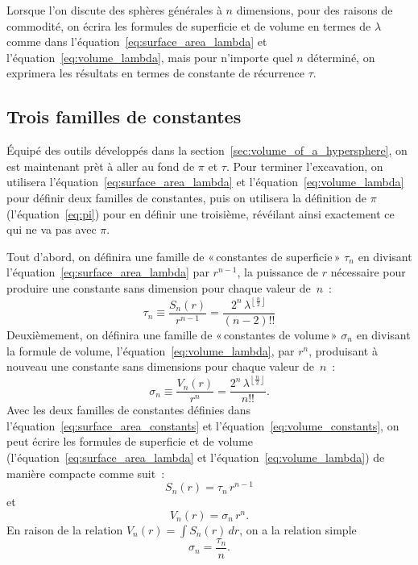 Lorsque l'on discute des sphères générales à $n$ dimensions, pour des raisons de commodité, on écrira les formules de superficie et de volume en termes de $\lambda$ comme dans l'équation~\eqref{eq:surface_area_lambda} et l'équation~\eqref{eq:volume_lambda}, mais pour n'importe quel $n$ déterminé, on exprimera les résultats en termes de constante de récurrence $\tau$.




  \subsection{Trois familles de constantes} %
  \label{sec:three_families_of_constants}

Équipé des outils développés dans la section~\ref{sec:volume_of_a_hypersphere}, on est maintenant prèt à aller au fond de $\pi$ et $\tau$. Pour terminer l'excavation, on utilisera l'équation~\eqref{eq:surface_area_lambda} et l'équation~\eqref{eq:volume_lambda} pour définir deux familles de constantes, puis on utilisera la définition de $\pi$ (l'équation~\eqref{eq:pi}) pour en définir une troisième, révéilant ainsi exactement ce qui ne va pas avec $\pi$.

Tout d'abord, on définira une famille de «\,constantes de superficie\,» $\tau_n$ en divisant \linebreak l'équation~\eqref{eq:surface_area_lambda} par $r^{n-1}$, la puissance de $r$ nécessaire pour produire une constante sans dimension pour chaque valeur de~$n$~:
\begin{equation}
\label{eq:surface_area_constants}
\tau_n \equiv \frac{S_n(r)}{r^{n-1}} = \frac{2^n\,\lambda^{\left\lfloor \frac{n}{2} \right\rfloor}}{(n-2)!!}
\end{equation}
Deuxièmement, on définira une famille de «\,constantes de volume\,» $\sigma_n$ en divisant la formule de volume, l'équation~\eqref{eq:volume_lambda}, par $r^n$, produisant à nouveau une constante sans dimensions pour chaque valeur de~$n$~:
\begin{equation}
\label{eq:volume_constants}
\sigma_n \equiv \frac{V_n(r)}{r^n} = \frac{2^n\,\lambda^{\left\lfloor \frac{n}{2} \right\rfloor}}{n!!}.
\end{equation}
Avec les deux familles de constantes définies dans l'équation~\eqref{eq:surface_area_constants} et l'équation~\eqref{eq:volume_constants}, on peut écrire les formules de superficie et de volume (l'équation~\eqref{eq:surface_area_lambda} et l'équation~\eqref{eq:volume_lambda}) de manière compacte comme suit~:
\[ S_n(r) = \tau_n\,r^{n-1} \]
et
\[ V_n(r) = \sigma_n\,r^n. \]
En raison de la relation $V_n(r) = \int S_n(r)\,dr$, on a la relation simple
\[
\sigma_n = \frac{\tau_n}{n}.
\]

